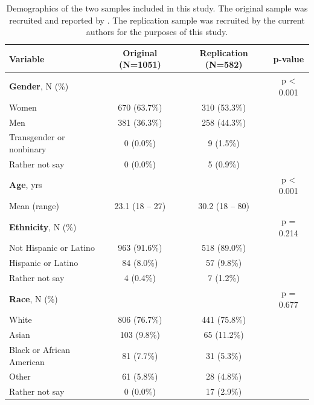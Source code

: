 \documentclass[letterpaper,man,natbib,longtable,floatsintext,12pt]{apa6}
\begin{document}
\begin{table}[t!]
    \centering
    \begin{tabular*}{\textwidth}{lccc}
    \toprule
    Variable & Original (N=1051) & Replication (N=582) & p-value \\
    \midrule
    \textbf{Gender}, N (\%)                & & & p < 0.001 \\
    \hspace{1em} Women                     & 670 (63.7\%) & 310 (53.3\%) & \\
    \hspace{1em} Men                       & 381 (36.3\%) & 258 (44.3\%) & \\
    \hspace{1em} Transgender or nonbinary         &   0  (0.0\%) &   9  (1.5\%) & \\
    \hspace{1em} Rather not say            &   0  (0.0\%) &   5  (0.9\%) & \\
    \midrule
    \textbf{Age}, yrs                      & & & p < 0.001 \\
    \hspace{1em} Mean (range)              & 23.1 (18 -- 27) & 30.2 (18 -- 80) & \\
    \midrule
    \textbf{Ethnicity}, N (\%)             & & & p = 0.214 \\
    \hspace{1em} Not Hispanic or Latino    & 963 (91.6\%) & 518 (89.0\%) & \\
    \hspace{1em} Hispanic or Latino        &  84  (8.0\%) &  57  (9.8\%) & \\
    \hspace{1em} Rather not say            &   4  (0.4\%) &   7  (1.2\%) & \\
    \midrule
    \textbf{Race}, N (\%)                  & & & p = 0.677 \\
    \hspace{1em} White                     & 806 (76.7\%) & 441 (75.8\%) & \\ 
    \hspace{1em} Asian                     & 103  (9.8\%) &  65 (11.2\%) & \\
    \hspace{1em} Black or African American &  81  (7.7\%) &  31  (5.3\%) & \\
    \hspace{1em} Other                     &  61  (5.8\%) &  28  (4.8\%) & \\
    \hspace{1em} Rather not say            &   0  (0.0\%) &  17  (2.9\%) & \\
    \bottomrule
    \end{tabular*}
    \caption{\normalfont Demographics of the two samples included in this study. The original sample was recruited and reported by \cite{teicher2015maltreatment}. The replication sample was recruited by the current authors for the purposes of this study.}
    \label{tab:demographics}
\end{table}
\end{document}
